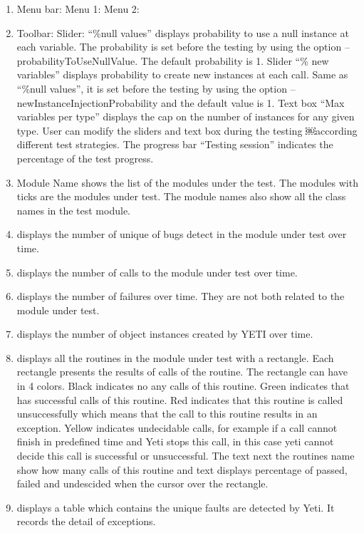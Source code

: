 \begin{enumerate}

\item Menu bar:
\subitem Menu 1:
\subitem Menu 2:
\item Toolbar:
\subitem Slider: “\%null values” displays probability to use a null instance at each variable. The probability is set before the testing by using the option –probabilityToUseNullValue. The default probability is 1. 
\subitem Slider “\% new variables” displays probability to create new instances at each call. Same as “\%null values”, it is set before the testing by using the option –newInstanceInjectionProbability and the default value is 1. 
\subitem Text box “Max variables per type” displays the cap on the number of instances for any given type. User can modify the sliders and text box during the testing ￼according different test strategies. 
\subitem The progress bar “Testing session” indicates the percentage of the test progress.
\item Module Name shows the list of the modules under the test. The
modules with ticks are the modules under test. The module names also show all the
class names in the test module.
\item displays the number of unique of bugs detect in the module under
test over time.
\item displays the number of calls to the module under test over time.
\item displays the number of failures over time. They are not both related
to the module under test.
\item displays the number of object instances created by YETI over time.
\item displays all the routines in the module under test with a rectangle.
Each rectangle presents the results of calls of the routine. The rectangle can have in 4 colors. Black indicates no any calls of this routine. Green indicates that has successful calls of this routine. Red indicates that this routine is called unsuccessfully which means that the call to this routine results in an exception. Yellow indicates undecidable calls, for example if a call cannot finish in predefined time and Yeti stops this call, in this case yeti cannot decide this call is successful or unsuccessful. The text next the routines name show how many calls of this routine and text displays percentage of passed, failed and undescided when the cursor over the rectangle.
\item displays a table which contains the unique faults are detected by Yeti. It records the detail of exceptions.


\end{enumerate}

